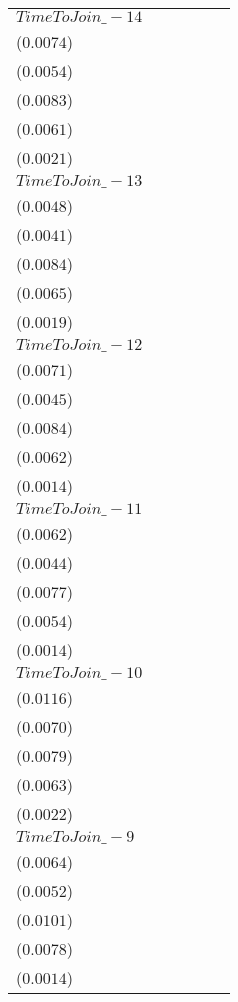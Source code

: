 \begin{tabular}{llllll}
$TimeToJoin\_-14$ &     \makecell{$0.0017^{}$ \\ ($0.0074$)} &     \makecell{$0.0009^{}$ \\ ($0.0054$)} &   \makecell{$-0.0165^{**}$ \\ ($0.0083$)} &     \makecell{$-0.0055^{}$ \\ ($0.0061$)} &   \makecell{$0.0047^{**}$ \\ ($0.0021$)} \\
$TimeToJoin\_-13$ &    \makecell{$-0.0016^{}$ \\ ($0.0048$)} &    \makecell{$-0.0039^{}$ \\ ($0.0041$)} &    \makecell{$-0.0162^{*}$ \\ ($0.0084$)} &     \makecell{$-0.0047^{}$ \\ ($0.0065$)} &    \makecell{$0.0033^{*}$ \\ ($0.0019$)} \\
$TimeToJoin\_-12$ &    \makecell{$-0.0042^{}$ \\ ($0.0071$)} &    \makecell{$-0.0040^{}$ \\ ($0.0045$)} &   \makecell{$-0.0192^{**}$ \\ ($0.0084$)} &     \makecell{$-0.0067^{}$ \\ ($0.0062$)} &   \makecell{$0.0033^{**}$ \\ ($0.0014$)} \\
$TimeToJoin\_-11$ &    \makecell{$-0.0049^{}$ \\ ($0.0062$)} &    \makecell{$-0.0047^{}$ \\ ($0.0044$)} &   \makecell{$-0.0192^{**}$ \\ ($0.0077$)} &     \makecell{$-0.0051^{}$ \\ ($0.0054$)} &   \makecell{$0.0029^{**}$ \\ ($0.0014$)} \\
$TimeToJoin\_-10$ &     \makecell{$0.0030^{}$ \\ ($0.0116$)} &     \makecell{$0.0014^{}$ \\ ($0.0070$)} &   \makecell{$-0.0200^{**}$ \\ ($0.0079$)} &     \makecell{$-0.0058^{}$ \\ ($0.0063$)} &   \makecell{$0.0043^{**}$ \\ ($0.0022$)} \\
$TimeToJoin\_-9$  &    \makecell{$-0.0069^{}$ \\ ($0.0064$)} &    \makecell{$-0.0067^{}$ \\ ($0.0052$)} &     \makecell{$-0.0164^{}$ \\ ($0.0101$)} &     \makecell{$-0.0015^{}$ \\ ($0.0078$)} &    \makecell{$0.0024^{*}$ \\ ($0.0014$)} \\

\end{tabular}
